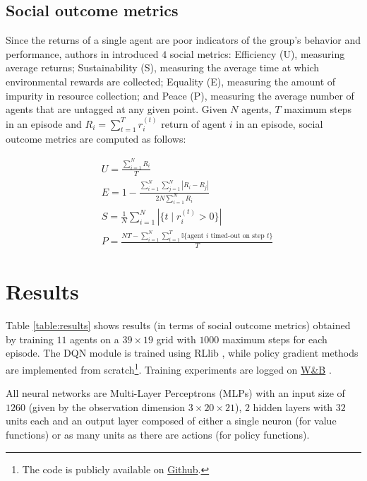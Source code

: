 \documentclass{article}
\begin{document}
\subsection{Social outcome metrics}
Since the returns of a single agent are poor indicators of the group's behavior and performance, authors in \cite{harvest} introduced $4$ social metrics: Efficiency (U), measuring average returns; Sustainability (S), measuring the average time at which environmental rewards are collected; Equality (E), measuring the amount of impurity in resource collection; and Peace (P), measuring the average number of agents that are untagged at any given point. Given $N$ agents, $T$ maximum steps in an episode and $R_i=\sum_{t=1}^T r_i^{(t)}$ return of agent $i$ in an episode, social outcome metrics are computed as follows:

\begin{equation}
  \label{eq:metrics}
  \begin{aligned}
    & U = \frac{\sum_{i=1}^N R_i}{T}\\
    & E = 1 - \frac{\sum_{i=1}^N\sum_{j=1}^N |R_i-R_j|}{2N\sum_{i=1}^N R_i} \\
    & S = \frac{1}{N}\sum_{i=1}^N |\{t\mid r_i^{(t)}>0\}| \\
    & P = \frac{NT-\sum_{i=1}^N\sum_{t=1}^T \mathbb{I}\{\text{agent } i \text{ timed-out on step } t\}}{T}
  \end{aligned}
\end{equation}

\section{Results}

Table \ref{table:results} shows results (in terms of social outcome metrics) obtained by training $11$ agents on a $39\times19$ grid with $1000$ maximum steps for each episode. The DQN module is trained using RLlib \cite{rllib}, while policy gradient methods are implemented from scratch\footnote{The code is publicly available on \href{https://github.com/Wadaboa/cpr-appropriation}{Github}.}. Training experiments are logged on \href{https://wandb.ai/wadaboa/cpr-appropriation}{W\&B} \cite{wandb}.

All neural networks are Multi-Layer Perceptrons (MLPs) with an input size of $1260$ (given by the observation dimension $3\times20\times21$), $2$ hidden layers with $32$ units each and an output layer composed of either a single neuron (for value functions) or as many units as there are actions (for policy functions).
\end{document}
